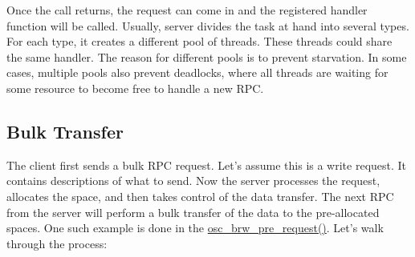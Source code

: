 Once the call returns, the request can come in and the registered handler
function will be called. Usually, server divides the task at hand into several
types. For each type, it creates a different pool of threads. These threads
could share the same handler. The reason for different pools is to prevent
starvation. In some cases, multiple pools also prevent deadlocks, where all
threads are waiting for some resource to become free to handle a new RPC. 

\subsection{Bulk Transfer}
\label{sec:bulktransfer}

The client first sends a bulk RPC request. Let's assume this is a write request.
It contains descriptions of what to send. Now the server processes the request,
allocates the space, and then takes control of the data transfer. The next
RPC from the server will perform a bulk transfer of the data to the
pre-allocated spaces. One such example is done in the
\url{osc_brw_pre_request()}. Let's walk through the process: 


